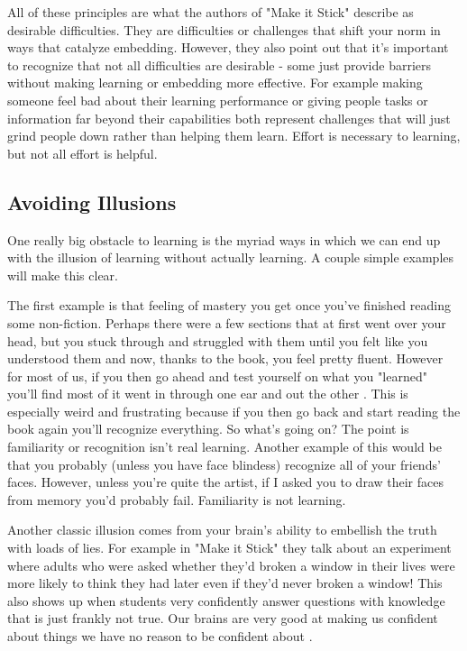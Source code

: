 \documentclass[11pt]{book}
\begin{document}
All of these principles are what the authors of "Make it Stick" \cite{stick} describe as desirable difficulties. They are difficulties or challenges that shift your norm in ways that catalyze embedding. However, they also point out that it's important to recognize that not all difficulties are desirable - some just provide barriers without making learning or embedding more effective. For example making someone feel bad about their learning performance or giving people tasks or information far beyond their capabilities both represent challenges that will just grind people down rather than helping them learn. Effort is necessary to learning, but not all effort is helpful.

\subsection{Avoiding Illusions}
One really big obstacle to learning is the myriad ways in which we can end up with the illusion of learning without actually learning. A couple simple examples will make this clear.
\newline

The first example is that feeling of mastery you get once you've finished reading some non-fiction. Perhaps there were a few sections that at first went over your head, but you stuck through and struggled with them until you felt like you understood them and now, thanks to the book, you feel pretty fluent. However for most of us, if you then go ahead and test yourself on what you "learned" you'll find most of it went in through one ear and out the other \cite{stick}. This is especially weird and frustrating because if you then go back and start reading the book again you'll recognize everything. So what's going on? The point is familiarity or recognition isn't real learning. Another example of this would be that you probably (unless you have face blindess) recognize all of your friends' faces. However, unless you're quite the artist, if I asked you to draw their faces from memory you'd probably fail. Familiarity is not learning.
\newline

Another classic illusion comes from your brain's ability to embellish the truth with loads of lies. For example in "Make it Stick" they talk about an experiment where adults who were asked whether they'd broken a window in their lives were more likely to think they had later even if they'd never broken a window! This also shows up when students very confidently answer questions with knowledge that is just frankly not true. Our brains are very good at making us confident about things we have no reason to be confident about \cite{stick}. 
\newline
\end{document}

